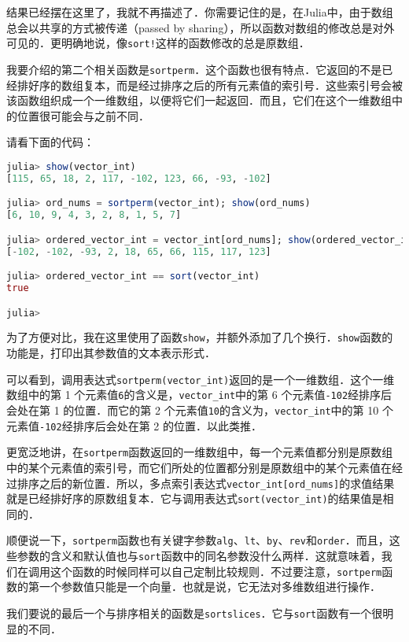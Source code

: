 结果已经摆在这里了，我就不再描述了．你需要记住的是，在Julia中，由于数组总会以共享的方式被传递（passed by sharing），所以函数对数组的修改总是对外可见的．更明确地说，像\verb|sort!|这样的函数修改的总是原数组．

我要介绍的第二个相关函数是\verb|sortperm|．这个函数也很有特点．它返回的不是已经排好序的数组复本，而是经过排序之后的所有元素值的索引号．这些索引号会被该函数组织成一个一维数组，以便将它们一起返回．而且，它们在这个一维数组中的位置很可能会与之前不同．

请看下面的代码：

\begin{lstlisting}[language=julia]
julia> show(vector_int)
[115, 65, 18, 2, 117, -102, 123, 66, -93, -102]

julia> ord_nums = sortperm(vector_int); show(ord_nums)
[6, 10, 9, 4, 3, 2, 8, 1, 5, 7]

julia> ordered_vector_int = vector_int[ord_nums]; show(ordered_vector_int)
[-102, -102, -93, 2, 18, 65, 66, 115, 117, 123]

julia> ordered_vector_int == sort(vector_int)
true

julia>
\end{lstlisting}

为了方便对比，我在这里使用了函数\verb|show|，并额外添加了几个换行．\verb|show|函数的功能是，打印出其参数值的文本表示形式．

可以看到，调用表达式\verb|sortperm(vector_int)|返回的是一个一维数组．这个一维数组中的第 1 个元素值\verb|6|的含义是，\verb|vector_int|中的第 6 个元素值\verb|-102|经排序后会处在第 1 的位置．而它的第 2 个元素值\verb|10|的含义为，\verb|vector_int|中的第 10 个元素值\verb|-102|经排序后会处在第 2 的位置．以此类推．

更宽泛地讲，在\verb|sortperm|函数返回的一维数组中，每一个元素值都分别是原数组中的某个元素值的索引号，而它们所处的位置都分别是原数组中的某个元素值在经过排序之后的新位置．所以，多点索引表达式\verb|vector_int[ord_nums]|的求值结果就是已经排好序的原数组复本．它与调用表达式\verb|sort(vector_int)|的结果值是相同的．

顺便说一下，\verb|sortperm|函数也有关键字参数\verb|alg|、\verb|lt|、\verb|by|、\verb|rev|和\verb|order|．而且，这些参数的含义和默认值也与\verb|sort|函数中的同名参数没什么两样．这就意味着，我们在调用这个函数的时候同样可以自己定制比较规则．不过要注意，\verb|sortperm|函数的第一个参数值只能是一个向量．也就是说，它无法对多维数组进行操作．

我们要说的最后一个与排序相关的函数是\verb|sortslices|．它与\verb|sort|函数有一个很明显的不同．

